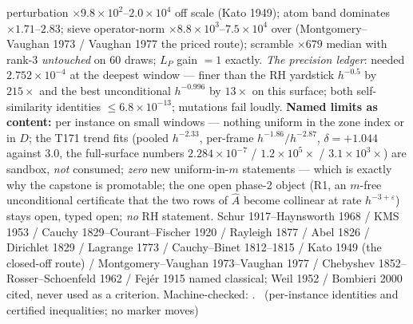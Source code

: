 \documentclass[11pt,a4paper]{article}
\theoremstyle{definition}
\begin{document}
perturbation $\times9.8\times10^{2}$--$2.0\times10^{4}$ off scale
(Kato 1949); atom band dominates $\times1.71$--$2.83$; sieve
operator-norm $\times8.8\times10^{3}$--$7.5\times10^{4}$ over
(Montgomery--Vaughan 1973 / Vaughan 1977 the priced route); scramble
$\times679$ median with rank-3 \emph{untouched} on $60$ draws; $L_P$
gain $=1$ exactly.
\emph{The precision ledger}: needed $2.752\times10^{-4}$ at the deepest
window --- finer than the RH yardstick $h^{-0.5}$ by $215\times$ and
the best unconditional $h^{-0.996}$ by $13\times$ on this surface; both
self-similarity identities $\le6.8\times10^{-13}$; mutations fail
loudly.
\textbf{Named limits as content:} per instance on small windows ---
nothing uniform in the zone index or in $D$; the T171 trend fits
(pooled $h^{-2.33}$, per-frame $h^{-1.86}/h^{-2.87}$, $\delta=+1.044$
against $3.0$, the full-surface numbers $2.284\times10^{-7}$ /
$1.2\times10^{5}\times$ / $3.1\times10^{3}\times$) are sandbox,
\emph{not} consumed; \emph{zero} new uniform-in-$m$ statements ---
which is exactly why the capstone is promotable; the one open phase-2
object (R1, an $m$-free unconditional certificate that the two rows of
$\hat A$ become collinear at rate $h^{-3+\varepsilon}$) stays open,
typed open; \emph{no} RH statement.
Schur 1917--Haynsworth 1968 / KMS 1953 / Cauchy 1829--Courant--Fischer
1920 / Rayleigh 1877 / Abel 1826 / Dirichlet 1829 / Lagrange 1773 /
Cauchy--Binet 1812--1815 / Kato 1949 (the closed-off route) /
Montgomery--Vaughan 1973--Vaughan 1977 / Chebyshev
1852--Rosser--Schoenfeld 1962 / Fej\'er 1915 named classical; Weil 1952
/ Bombieri 2000 cited, never used as a criterion.
Machine-checked:
.
\mE\ (per-instance identities and certified inequalities; no marker moves)
\end{document}
